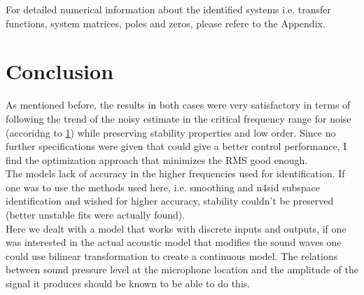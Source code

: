 For detailed numerical information about the identified systems i.e. transfer functions, system matrices, poles and zeros, please refere to the Appendix.

\chapter{Conclusion}

As mentioned before, the results in both cases were very satisfactory in terms of following the trend of the noisy estimate in the critical frequency range for noise (accoridng to \ref{}) while preserving stability properties and low order. Since no further specifications were given that could give a better control performance, I find the optimization approach that minimizes the RMS good enough.\\

The models lack of accuracy in the higher frequencies used for identification. If one was to use the methods used here, i.e. smoothing and n4sid subspace identification and wished for higher accuracy, stability couldn't be preserved (better unstable fits were actually found).\\

Here we dealt with a model that works with discrete inputs and outputs, if one was interested in the actual acoustic model that modifies the sound waves one could use bilinear transformation to create a continuous model. The relations between sound pressure level at the microphone location and the amplitude of the signal it produces should be known to be able to do this.


